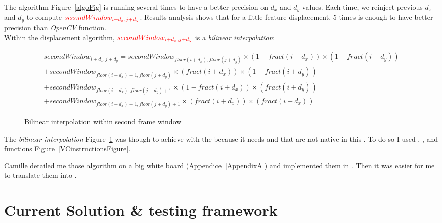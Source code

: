 The algorithm Figure~\ref{algoFig} is running several times to have a better precision on $d_{x}$ and $d_{y}$ values. Each time, we reinject previous $d_{x}$ and $d_{y}$ to compute $\textcolor{red}{secondWindow_{i+d_{x},j+d_{y}}}$. Results analysis shows that for a little feature displacement, 5 times is enough to have better precision than \emph{OpenCV} function.\\


Within the displacement algorithm, $\textcolor{red}{secondWindow_{i+d_{x},j+d_{y}}}$ is a \emph{bilinear interpolation}:

\begin{figure}[!htbp]
\begin{equation*}
	\begin{split}
		secondWindow_{i+d_{x},j+d_{y}} = secondWindow_{floor(i+d_{x}),floor(j+d_{y})}\times (1-fract(i+d_{x}))\times (1-fract(i+d_{y}))\\
		+ secondWindow_{floor(i+d_{x})+1,floor(j+d_{y})}\times (fract(i+d_{x}))\times (1-fract(i+d_{y}))\\
		+ secondWindow_{floor(i+d_{x}),floor(j+d_{y})+1}\times (1-fract(i+d_{x}))\times (fract(i+d_{y}))\\
		+ secondWindow_{floor(i+d_{x})+1,floor(j+d_{y})+1} \times (fract(i+d_{x}))\times (fract(i+d_{x}))
	\end{split}
\end{equation*}
\caption{Bilinear interpolation within second frame window}
\label{BIPFig}
\end{figure}
\FloatBarrier

The \emph{bilinear interpolation} Figure~\ref{BIPFig} was though to achieve with the \vc{} because it needs  and  that are not native in this . To do so I used , , and  functions Figure~\ref{VCinstructionsFigure}.


Camille detailed me those algorithm on a big white board (Appendice~\ref{AppendixA}) and implemented them in . Then it was easier for me to translate them into .


\section{Current Solution \& testing framework}

